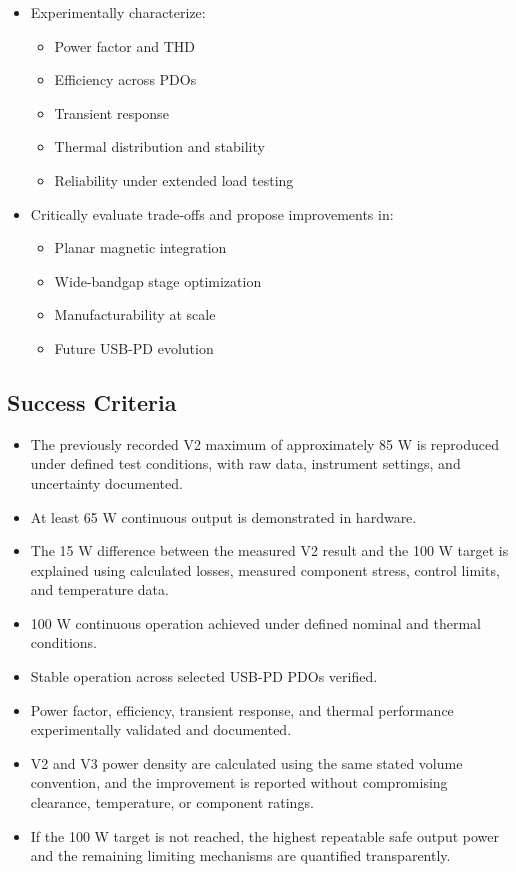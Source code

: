 \documentclass[12pt,a4paper]{report}
\begin{document}
\begin{itemize}
    \item Experimentally characterize:
    \begin{itemize}
        \item Power factor and THD
        \item Efficiency across PDOs
        \item Transient response
        \item Thermal distribution and stability
        \item Reliability under extended load testing
    \end{itemize}

    \item Critically evaluate trade-offs and propose improvements in:
    \begin{itemize}
        \item Planar magnetic integration
        \item Wide-bandgap stage optimization
        \item Manufacturability at scale
        \item Future USB-PD evolution
    \end{itemize}
\end{itemize}

\subsection*{Success Criteria}

\begin{itemize}
    \item The previously recorded V2 maximum of approximately 85 W is reproduced under defined test conditions, with raw data, instrument settings, and uncertainty documented.
    \item At least 65 W continuous output is demonstrated in hardware.
    \item The 15 W difference between the measured V2 result and the 100 W target is explained using calculated losses, measured component stress, control limits, and temperature data.
    \item 100 W continuous operation achieved under defined nominal and thermal conditions.
    \item Stable operation across selected USB-PD PDOs verified.
    \item Power factor, efficiency, transient response, and thermal performance experimentally validated and documented.
    \item V2 and V3 power density are calculated using the same stated volume convention, and the improvement is reported without compromising clearance, temperature, or component ratings.
    \item If the 100 W target is not reached, the highest repeatable safe output power and the remaining limiting mechanisms are quantified transparently.
\end{itemize}
\end{document}
